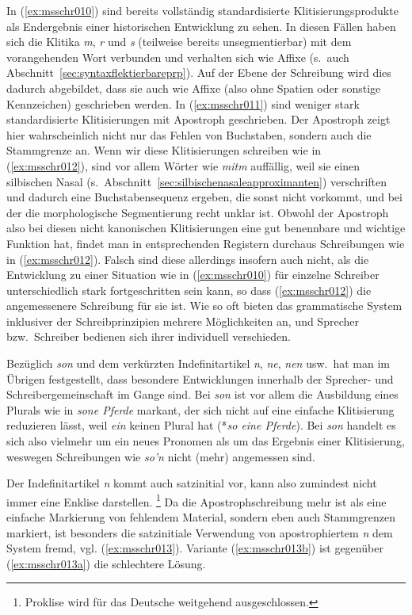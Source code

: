 In (\ref{ex:msschr010}) sind bereits vollständig standardisierte Klitisierungsprodukte als Endergebnis einer historischen Entwicklung zu sehen.
In diesen Fällen haben sich die Klitika \textit{m}, \textit{r} und \textit{s} (teilweise bereits unsegmentierbar) mit dem vorangehenden Wort verbunden und verhalten sich wie Affixe (s.\ auch Abschnitt~\ref{sec:syntaxflektierbareprp}).
Auf der Ebene der Schreibung wird dies dadurch abgebildet, dass sie auch wie Affixe (also ohne Spatien oder sonstige Kennzeichen) geschrieben werden.
In (\ref{ex:msschr011}) sind weniger stark standardisierte Klitisierungen mit Apostroph geschrieben.
Der Apostroph zeigt hier wahrscheinlich nicht nur das Fehlen von Buchstaben, sondern auch die Stammgrenze an.
Wenn wir diese Klitisierungen schreiben wie in (\ref{ex:msschr012}), sind vor allem Wörter wie \textit{mitm} auffällig, weil sie einen silbischen Nasal (s.\ Abschnitt~\ref{sec:silbischenasaleapproximanten}) verschriften und dadurch eine Buchstabensequenz ergeben, die sonst nicht vorkommt, und bei der die morphologische Segmentierung recht unklar ist.
Obwohl der Apostroph also bei diesen nicht kanonischen Klitisierungen eine gut benennbare und wichtige Funktion hat, findet man in entsprechenden Registern durchaus Schreibungen wie in (\ref{ex:msschr012}).
Falsch sind diese allerdings insofern auch nicht, als die Entwicklung zu einer Situation wie in (\ref{ex:msschr010}) für einzelne Schreiber unterschiedlich stark fortgeschritten sein kann, so dass (\ref{ex:msschr012}) die angemessenere Schreibung für sie ist.
Wie so oft bieten das grammatische System inklusiver der Schreibprinzipien mehrere Möglichkeiten an, und Sprecher bzw.\ Schreiber bedienen sich ihrer individuell verschieden.

Bezüglich \textit{son} und dem verkürzten Indefinitartikel \textit{n}, \textit{ne}, \textit{nen} usw.\ hat man im Übrigen festgestellt, dass besondere Entwicklungen innerhalb der Sprecher- und Schreibergemeinschaft im Gange sind.
Bei \textit{son} ist vor allem die Ausbildung eines Plurals wie in \textit{sone Pferde} markant, der sich nicht auf eine einfache Klitisierung reduzieren lässt, weil \textit{ein} keinen Plural hat (*\textit{so eine Pferde}).
Bei \textit{son} handelt es sich also vielmehr um ein neues Pronomen als um das Ergebnis einer Klitisierung, weswegen Schreibungen wie \textit{so'n} nicht (mehr) angemessen sind.

Der Indefinitartikel \textit{n} kommt \zB auch satzinitial vor, kann also zumindest nicht immer eine Enklise darstellen.\label{abs:nen}%
\footnote{Proklise wird für das Deutsche weitgehend ausgeschlossen.}
Da die Apo\-stroph\-schrei\-bung mehr ist als eine einfache Markierung von fehlendem Material, sondern eben auch Stammgrenzen markiert, ist besonders die satzinitiale Verwendung von apostrophiertem \textit{n} dem System fremd, vgl. (\ref{ex:msschr013}).
Variante (\ref{ex:msschr013b}) ist gegenüber (\ref{ex:msschr013a}) die schlechtere Lösung.

